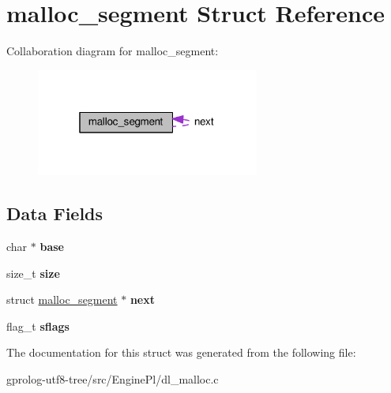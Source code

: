 \hypertarget{structmalloc__segment}{}\section{malloc\+\_\+segment Struct Reference}
\label{structmalloc__segment}


Collaboration diagram for malloc\+\_\+segment\+:\nopagebreak
\begin{figure}[H]
\begin{center}
\leavevmode
\includegraphics[width=208pt]{structmalloc__segment__coll__graph}
\end{center}
\end{figure}
\subsection*{Data Fields}
\begin{DoxyCompactItemize}
\item 
char $\ast$ {\bfseries base}\hypertarget{structmalloc__segment_ad4c68a4113c3a4f9b167aadaa7c31b89}{}\label{structmalloc__segment_ad4c68a4113c3a4f9b167aadaa7c31b89}

\item 
size\+\_\+t {\bfseries size}\hypertarget{structmalloc__segment_a392a23ee3bd7a167e5f6382793a8eba1}{}\label{structmalloc__segment_a392a23ee3bd7a167e5f6382793a8eba1}

\item 
struct \hyperlink{structmalloc__segment}{malloc\+\_\+segment} $\ast$ {\bfseries next}\hypertarget{structmalloc__segment_a92c4c9f618dba33fd8628d743cc02f5a}{}\label{structmalloc__segment_a92c4c9f618dba33fd8628d743cc02f5a}

\item 
flag\+\_\+t {\bfseries sflags}\hypertarget{structmalloc__segment_ac48f17d9495d732749db6544cabbec2c}{}\label{structmalloc__segment_ac48f17d9495d732749db6544cabbec2c}

\end{DoxyCompactItemize}


The documentation for this struct was generated from the following file\+:\begin{DoxyCompactItemize}
\item 
gprolog-\/utf8-\/tree/src/\+Engine\+Pl/dl\+\_\+malloc.\+c\end{DoxyCompactItemize}
